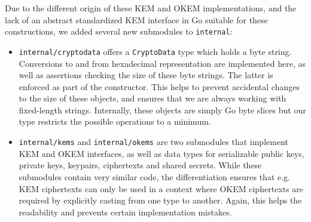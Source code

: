 Due to the different origin of these KEM and OKEM implementations, and the lack of an abstract standardized KEM interface in Go suitable for these constructions, we added several new submodules to \texttt{internal}:
\begin{itemize}
    \item \texttt{internal/cryptodata} offers a \texttt{CryptoData} type which holds a byte string. Conversions to and from hexadecimal representation are implemented here, as well as assertions checking the size of these byte strings. The latter is enforced as part of the constructor. This helps to prevent accidental changes to the size of these objects, and ensures that we are always working with fixed-length strings. Internally, these objects are simply Go byte slices but our type restricts the possible operations to a minimum.

    \item \texttt{internal/kems} and \texttt{internal/okems} are two submodules that implement KEM and OKEM interfaces, as well as data types for serializable public keys, private keys, keypairs, ciphertexts and shared secrets. While these submodules contain very similar code, the differentiation ensures that e.g. KEM ciphertexts can only be used in a context where OKEM ciphertexts are required by explicitly casting from one type to another. Again, this helps the readability and prevents certain implementation mistakes.


\end{itemize}
